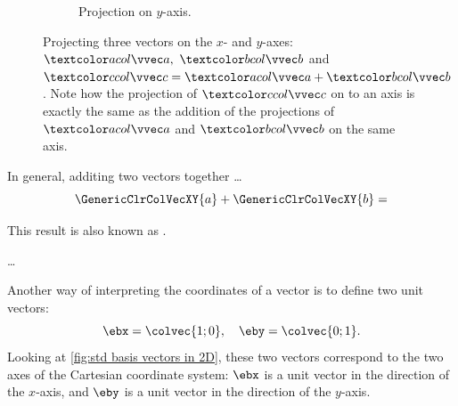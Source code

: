 \begin{figure}
\begin{center}
\begin{subfigure}[t]{0.47\textwidth}
			\caption{Projection on $y$-axis.}
		\end{subfigure}
	\end{center}
	\caption{Projecting three vectors on the $x$- and $y$-axes: $\vveca,\ \vvecb$ and $\vvecc=\vveca+\vvecb$. Note how the projection of $\vvecc$ on to an axis is exactly the same as the addition of the projections of $\vveca$ and $\vvecb$ on the same axis.}
	\label{fig:addition of column vectors}
\end{figure}

In general, additing two vectors together \dots
\begin{equation}
	\GenericClrColVecXY{a} + \GenericClrColVecXY{b} =
	\label{eq:}
\end{equation}

This result is also known as .

\dots

Another way of interpreting the coordinates of a vector is to define two unit vectors:
\begin{equation}
	\ebx = \colvec{1;0},\quad\eby = \colvec{0;1}.
	\label{eq:std basis vectors in 2D}
\end{equation}
Looking at \autoref{fig:std basis vectors in 2D}, these two vectors correspond to the two axes of the Cartesian coordinate system: $\ebx$ is a unit vector in the direction of the $x$-axis, and $\eby$ is a unit vector in the direction of the $y$-axis.

\begin{figure}
	\begin{center}
	\end{center}
	\caption{}
	\label{fig:std basis vectors in 2D}
\end{figure}



